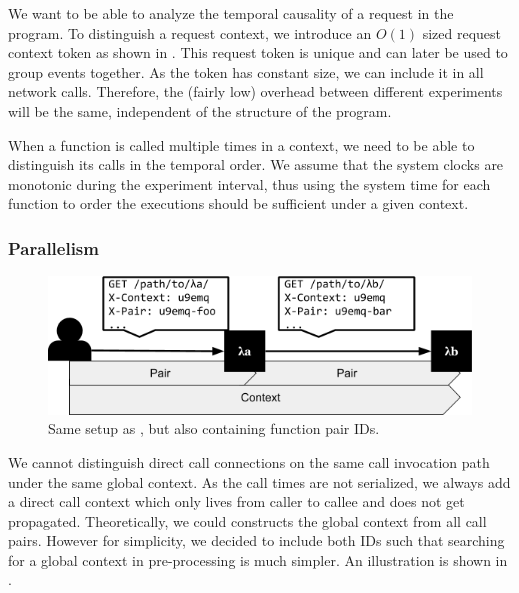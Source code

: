 \documentclass[../main.tex]{subfiles}
\begin{document}
We want to be able to analyze the temporal causality of a request in the program. 
To distinguish a request context, we introduce an $ O(1) $ sized request context token as shown in . 
This request token is unique and can later be used to group events together. 
As the token has constant size, we can include it in all network calls. 
Therefore, the (fairly low) overhead between different experiments will be the same, independent of the structure of the program.

When a function is called multiple times in a context, 
we need to be able to distinguish its calls in the temporal order. 
We assume that the system clocks are monotonic during the experiment interval, 
thus using the system time for each function to order the executions should be sufficient under a given context.

\subsubsection{Parallelism}%
\label{ssub:designFunctionParallelism}

\begin{figure}
\begin{center}
  \includegraphics[width=\linewidth,keepaspectratio]{./multiple-functions-context-and-call-id.png}
\end{center}
\caption[Multiple Function Calls With Context and Pair IDs]{Same setup as , but also containing function pair IDs.}%
\label{fig:contextAndPairIDs}
\end{figure}

We cannot distinguish direct call connections on the same call invocation path under the same global context. 
As the call times are not serialized, we always add a direct call context which only lives from caller to callee and does not get propagated. 
Theoretically, we could constructs the global context from all call pairs. 
However for simplicity, we decided to include both IDs such that searching for a global context in pre-processing is much simpler.
An illustration is shown in .
\end{document}

